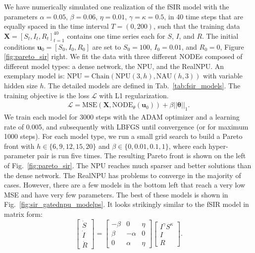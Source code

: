 \documentclass[9pt]{article}
\newcommand{\npu}{\text{NPU}}
\newcommand{\nau}{\text{NAU}}
\newcommand{\chain}{\text{Chain}}
\renewcommand{\arraystretch}{1.2}
\begin{document}
We have numerically simulated one realization of the fSIR model with the
parameters $\alpha=0.05$, $\beta=0.06$, $\eta=0.01$, $\gamma=\kappa=0.5$, in 40
time steps that are equally spaced in the time interval $T=(0,200)$, such that
the training data $\bm X = [S_t,I_t,R_t]_{t=1}^{40}$
contains one time series each for $S$, $I$, and $R$.  The initial conditions
$\bm u_0=[S_0,I_0,R_0]$ are set to $S_0=100$, $I_0=0.01$, and $R_0=0$, Figure
\ref{fig:pareto_sir} right.
We fit the data with three
different NODEs composed of different model types: a dense network, the NPU, and
the RealNPU. An exemplary model is: $\npu=\chain(\npu(3,h),\nau(h,3))$ with
variable hidden size $h$.  The detailed models are defined in
Tab.~\ref{tab:fsir_models}. The training objective is the loss $\mathcal{L}$
with L1 regularization.
\begin{align}
  \label{eq:sir_loss}
  \mathcal{L} = \text{MSE}(\bm X,\text{NODE}_\theta(\bm u_0)) + \beta||\bm\theta||_1.
\end{align}
We train each model for 3000 steps with the ADAM optimizer and a learning rate
of 0.005, and subsequently with LBFGS until convergence (or for maximum 1000
steps).  For each model type, we run a small grid search to build a Pareto front
with $h\in \{6,9,12,15,20\}$ and $\beta\in\{0,0.01,0.1,1\}$, where each
hyper-parameter pair is run five times. The resulting Pareto front is shown on
the left of Fig.~\ref{fig:pareto_sir}. The NPU reaches much sparser and
better solutions than the dense network.
The RealNPU has problems to converge in the majority of cases.
However, there are a few models in the bottom left that
reach a very low MSE and have very few parameters. The best of these models is
shown in Fig.~\ref{fig:sir_gatednpu_modelps}.  It looks strikingly similar to
the fSIR model in matrix form:
\renewcommand*{\arraystretch}{1.3}
\begin{equation}
  \begin{bmatrix}
    \dot S \\ \dot I \\ \dot R
  \end{bmatrix}
  =
  \begin{bmatrix}
    -\beta & 0 & \eta \\
    \beta & -\alpha & 0 \\
    0 & \alpha & \eta
  \end{bmatrix}
  \begin{bmatrix}
    I^\gamma S^\kappa \\ I \\ R
  \end{bmatrix}.
\end{equation}
\end{document}
